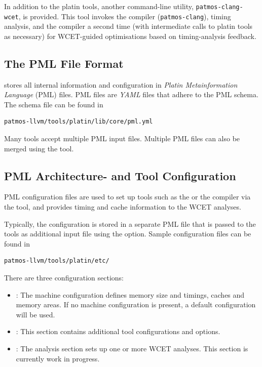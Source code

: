 In addition to the platin tools, another command-line utility,
\texttt{patmos-clang-wcet}, is provided. This tool invokes the compiler
(\texttt{patmos-clang}), timing analysis, and the compiler a second time
(with intermediate calls to platin tools as necessary) for WCET-guided
optimisations based on timing-analysis feedback.

\subsection{The PML File Format}

 stores all internal information and configuration in \emph{Platin Metainformation Language} (PML) files.
PML files are \emph{YAML} files that adhere to the PML schema. The schema file can be found in

\begin{verbatim}
patmos-llvm/tools/platin/lib/core/pml.yml
\end{verbatim}


Many  tools accept multiple PML input files. Multiple PML files can also be merged using
the  tool.

\subsection{PML Architecture- and Tool Configuration}

PML configuration files are used to set up tools such as the  or the
 compiler via the  tool, and provides timing and cache information to the WCET analyses.

Typically, the configuration is stored in a separate PML file that is passed to the  tools as
additional input file using the  option. Sample configuration files can be found in

\begin{verbatim}
patmos-llvm/tools/platin/etc/
\end{verbatim}




There are three configuration sections: 
\begin{itemize}
\item {}: The machine configuration defines memory size and timings, caches and memory areas.
  If no machine configuration is present, a default configuration will be used.
\item {}: This section contains additional tool configurations and options.
\item {}: The analysis section sets up one or more WCET analyses. This section is currently work in progress.
\end{itemize}

